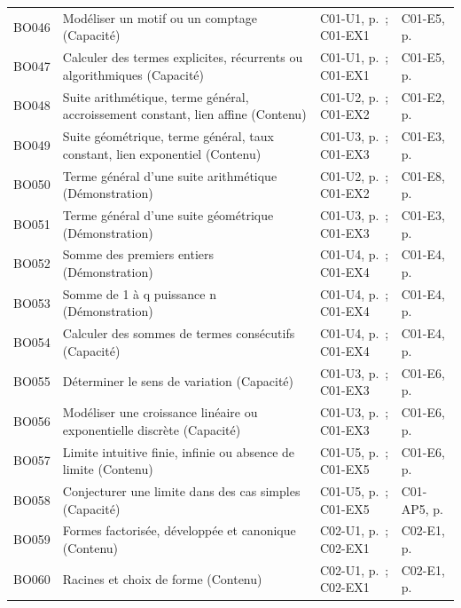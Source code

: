 \begin{longtable}{p{.1\linewidth}p{.43\linewidth}p{.19\linewidth}p{.16\linewidth}}
BO046 & Modéliser un motif ou un comptage (Capacité) & C01-U1, p.\,\pageref{C01-U1} ; C01-EX1 & C01-E5, p.\,\pageref{C01-E5} \\
BO047 & Calculer des termes explicites, récurrents ou algorithmiques (Capacité) & C01-U1, p.\,\pageref{C01-U1} ; C01-EX1 & C01-E5, p.\,\pageref{C01-E5} \\
BO048 & Suite arithmétique, terme général, accroissement constant, lien affine (Contenu) & C01-U2, p.\,\pageref{C01-U2} ; C01-EX2 & C01-E2, p.\,\pageref{C01-E2} \\
BO049 & Suite géométrique, terme général, taux constant, lien exponentiel (Contenu) & C01-U3, p.\,\pageref{C01-U3} ; C01-EX3 & C01-E3, p.\,\pageref{C01-E3} \\
BO050 & Terme général d’une suite arithmétique (Démonstration) & C01-U2, p.\,\pageref{C01-U2} ; C01-EX2 & C01-E8, p.\,\pageref{C01-E8} \\
BO051 & Terme général d’une suite géométrique (Démonstration) & C01-U3, p.\,\pageref{C01-U3} ; C01-EX3 & C01-E3, p.\,\pageref{C01-E3} \\
BO052 & Somme des premiers entiers (Démonstration) & C01-U4, p.\,\pageref{C01-U4} ; C01-EX4 & C01-E4, p.\,\pageref{C01-E4} \\
BO053 & Somme de 1 à q puissance n (Démonstration) & C01-U4, p.\,\pageref{C01-U4} ; C01-EX4 & C01-E4, p.\,\pageref{C01-E4} \\
BO054 & Calculer des sommes de termes consécutifs (Capacité) & C01-U4, p.\,\pageref{C01-U4} ; C01-EX4 & C01-E4, p.\,\pageref{C01-E4} \\
BO055 & Déterminer le sens de variation (Capacité) & C01-U3, p.\,\pageref{C01-U3} ; C01-EX3 & C01-E6, p.\,\pageref{C01-E6} \\
BO056 & Modéliser une croissance linéaire ou exponentielle discrète (Capacité) & C01-U3, p.\,\pageref{C01-U3} ; C01-EX3 & C01-E6, p.\,\pageref{C01-E6} \\
BO057 & Limite intuitive finie, infinie ou absence de limite (Contenu) & C01-U5, p.\,\pageref{C01-U5} ; C01-EX5 & C01-E6, p.\,\pageref{C01-E6} \\
BO058 & Conjecturer une limite dans des cas simples (Capacité) & C01-U5, p.\,\pageref{C01-U5} ; C01-EX5 & C01-AP5, p.\,\pageref{C01-AP5} \\
BO059 & Formes factorisée, développée et canonique (Contenu) & C02-U1, p.\,\pageref{C02-U1} ; C02-EX1 & C02-E1, p.\,\pageref{C02-E1} \\
BO060 & Racines et choix de forme (Contenu) & C02-U1, p.\,\pageref{C02-U1} ; C02-EX1 & C02-E1, p.\,\pageref{C02-E1} \\

\end{longtable}
